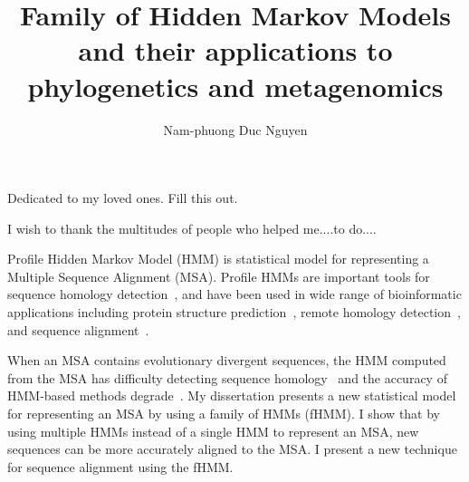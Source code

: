 \documentclass[12pt]{report}	%
\author{Nam-phuong Duc Nguyen}  	%
\title{Family of Hidden Markov Models and their applications to phylogenetics and metagenomics}
\theoremstyle{definition}
\theoremstyle{remark}
\begin{document}
\sloppy
\copyrightpage          %


%
%
%
\commcertpage           %

\titlepage              %



%
\begin{dedication}
%
Dedicated to my loved ones.  Fill this out.
\end{dedication}


\begin{acknowledgments}%
%
I wish to thank the multitudes of people who helped me....to do....
\end{acknowledgments}



\utabstract
{}%
\indent

Profile Hidden Markov Model (HMM) is statistical model for representing a Multiple Sequence Alignment (MSA).  Profile HMMs are important tools for sequence homology detection~\cite{Eddy1998}, and have been used in wide range of bioinformatic applications including protein structure prediction~\cite{Karplus2009,Soding2005,Chen2005}, remote homology detection~\cite{Soding2005}, and sequence alignment~\cite{hmmer}.  

When an MSA contains evolutionary divergent sequences, the HMM computed from the MSA has difficulty detecting sequence homology~\cite{Moriyama2006,Finn2010} and the accuracy of HMM-based methods degrade~\cite{Mirarab2012}.  My dissertation presents a new statistical model for representing an MSA by using a family of HMMs (fHMM).  I show that by using multiple HMMs instead of a single HMM to represent an MSA, new sequences can be more accurately aligned to the MSA.  I present a new technique for sequence alignment using the fHMM.
\end{document}
